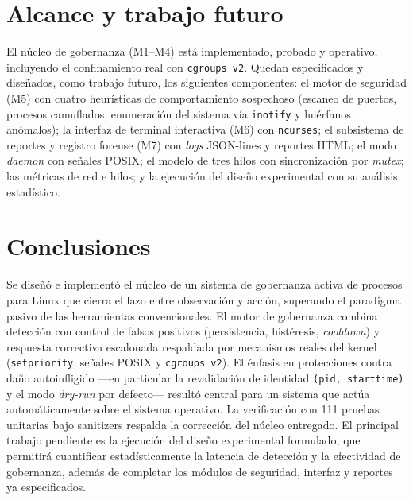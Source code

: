 \documentclass[conference]{IEEEtran}
\begin{document}
\section{Alcance y trabajo futuro}
\label{sec:alcance}

El núcleo de gobernanza (M1--M4) está implementado, probado y operativo,
incluyendo el confinamiento real con \texttt{cgroups~v2}. Quedan especificados y
diseñados, como trabajo futuro, los siguientes componentes: el motor de seguridad
(M5) con cuatro heurísticas de comportamiento sospechoso (escaneo de puertos,
procesos camuflados, enumeración del sistema vía \texttt{inotify} y huérfanos
anómalos); la interfaz de terminal interactiva (M6) con \texttt{ncurses}; el
subsistema de reportes y registro forense (M7) con \emph{logs} JSON-lines y
reportes HTML; el modo \emph{daemon} con señales POSIX; el modelo de tres hilos
con sincronización por \emph{mutex}; las métricas de red e hilos; y la ejecución
del diseño experimental con su análisis estadístico.

\section{Conclusiones}

Se diseñó e implementó el núcleo de un sistema de gobernanza activa de procesos
para Linux que cierra el lazo entre observación y acción, superando el paradigma
pasivo de las herramientas convencionales. El motor de gobernanza combina
detección con control de falsos positivos (persistencia, histéresis,
\emph{cooldown}) y respuesta correctiva escalonada respaldada por mecanismos
reales del kernel (\texttt{setpriority}, señales POSIX y \texttt{cgroups~v2}). El
énfasis en protecciones contra daño autoinfligido ---en particular la
revalidación de identidad \texttt{(pid, starttime)} y el modo \emph{dry-run} por
defecto--- resultó central para un sistema que actúa automáticamente sobre el
sistema operativo. La verificación con 111 pruebas unitarias bajo sanitizers
respalda la corrección del núcleo entregado. El principal trabajo pendiente es la
ejecución del diseño experimental formulado, que permitirá cuantificar
estadísticamente la latencia de detección y la efectividad de gobernanza, además
de completar los módulos de seguridad, interfaz y reportes ya especificados.
\end{document}

